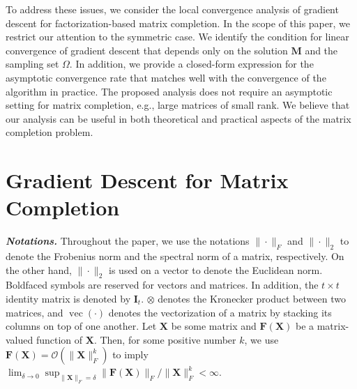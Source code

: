 \documentclass{article}
\newcommand{\hlnew}[1]{{#1}}
\newcommand{\norm}[1]{\|#1\|} %
\DeclareMathOperator*{\vect}{vec}
\begin{document}
To address these issues, we consider the local convergence analysis of gradient descent for factorization-based matrix completion. \hlnew{In the scope of this paper, we restrict our attention to the symmetric case. We identify the condition for linear convergence of gradient descent that depends only on the solution $\bm M$ and the sampling set $\Omega$.} In addition, we provide a closed-form expression for the asymptotic convergence rate that matches well with the convergence of the algorithm in practice. \hlnew{The proposed analysis does not require an asymptotic setting for matrix completion, e.g., large matrices of small rank}. We believe that our analysis can be useful in both theoretical and practical aspects of \hlnew{the} matrix completion problem.














\section{Gradient Descent for Matrix Completion}
\label{sec:prel}

\textit{\textbf{Notations.}} Throughout the paper, we use the notations $\norm{\cdot}_F$ and $\norm{\cdot}_2$ to denote the Frobenius norm and the spectral norm of a matrix, respectively. On the other hand, $\norm{\cdot}_2$ is used on a vector to denote the Euclidean norm. Boldfaced symbols are reserved for vectors and matrices. In addition, the $t \times t$ identity matrix is denoted by $\bm I_t$. $\otimes$ denotes the Kronecker product between two matrices, and $\vect(\cdot)$ denotes the vectorization of a matrix  by stacking its columns on top of one another. Let $\bm X$ be some matrix and $\bm F(\bm X)$ be a matrix-valued function of $\bm X$. Then, for some positive number $k$, we use $\bm F(\bm X) = \bm{\mathcal{O}}(\norm{\bm X}_F^k)$ to imply $\lim_{\delta \to 0} \sup_{\norm{\bm X}_F=\delta} \norm{\bm F(\bm X)}_F/\norm{\bm X}_F^k < \infty$.
\end{document}

